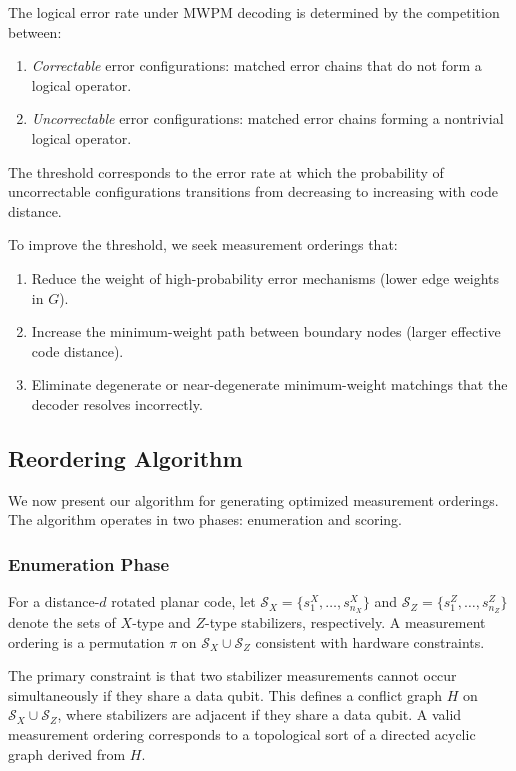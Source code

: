 \documentclass[
    reprint,
    aps,
    prx,
    superscriptaddress,
    longbibliography
]{revtex4-2}
\begin{document}
The logical error rate under MWPM decoding is determined by the competition between:
\begin{enumerate}[label=(\roman*)]
    \item \emph{Correctable} error configurations: matched error chains that do not form a logical operator.
    \item \emph{Uncorrectable} error configurations: matched error chains forming a nontrivial logical operator.
\end{enumerate}

The threshold corresponds to the error rate at which the probability of uncorrectable configurations transitions from decreasing to increasing with code distance.

To improve the threshold, we seek measurement orderings that:
\begin{enumerate}[label=(\roman*)]
    \item Reduce the weight of high-probability error mechanisms (lower edge weights in $G$).
    \item Increase the minimum-weight path between boundary nodes (larger effective code distance).
    \item Eliminate degenerate or near-degenerate minimum-weight matchings that the decoder resolves incorrectly.
\end{enumerate}

\subsection{Reordering Algorithm}
\label{subsec:reordering_algorithm}

We now present our algorithm for generating optimized measurement orderings. The algorithm operates in two phases: enumeration and scoring.

\subsubsection{Enumeration Phase}

For a distance-$d$ rotated planar code, let $\mathcal{S}_X = \{s_1^X, \ldots, s_{n_X}^X\}$ and $\mathcal{S}_Z = \{s_1^Z, \ldots, s_{n_Z}^Z\}$ denote the sets of $X$-type and $Z$-type stabilizers, respectively. A measurement ordering is a permutation $\pi$ on $\mathcal{S}_X \cup \mathcal{S}_Z$ consistent with hardware constraints.

The primary constraint is that two stabilizer measurements cannot occur simultaneously if they share a data qubit. This defines a conflict graph $H$ on $\mathcal{S}_X \cup \mathcal{S}_Z$, where stabilizers are adjacent if they share a data qubit. A valid measurement ordering corresponds to a topological sort of a directed acyclic graph derived from $H$.
\end{document}
